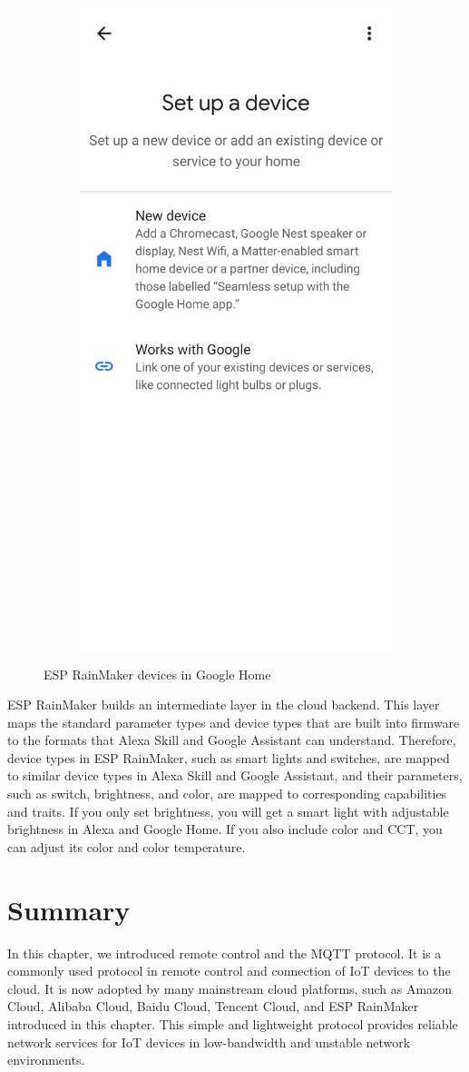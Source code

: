 \documentclass[a4paper,12pt,openany]{book}
\begin{document}
\begin{figure}[h!]
\begin{subfigure}{0.4\textwidth}
        \includegraphics[height=1.3\textwidth,frame]{D9Z/9-15b}
    \end{subfigure}
    \caption{ESP RainMaker devices in Google Home}
\end{figure}

ESP RainMaker builds an intermediate layer in the cloud backend. This layer maps the standard parameter types and device types that are built into firmware to the formats that Alexa Skill and Google Assistant can understand. Therefore, device types in ESP RainMaker, such as smart lights and switches, are mapped to similar device types in Alexa Skill and Google Assistant, and their parameters, such as switch, brightness, and color, are mapped to corresponding capabilities and traits. If you only set brightness, you will get a smart light with adjustable brightness in Alexa and Google Home. If you also include color and CCT, you can adjust its color and color temperature.

\section{Summary}
In this chapter, we introduced remote control and the MQTT protocol. It is a commonly used protocol in remote control and connection of IoT devices to the cloud. It is now adopted by many mainstream cloud platforms, such as Amazon Cloud, Alibaba Cloud, Baidu Cloud, Tencent Cloud, and ESP RainMaker introduced in this chapter. This simple and lightweight protocol provides reliable network services for IoT devices in low-bandwidth and unstable network environments. 
\end{document}
